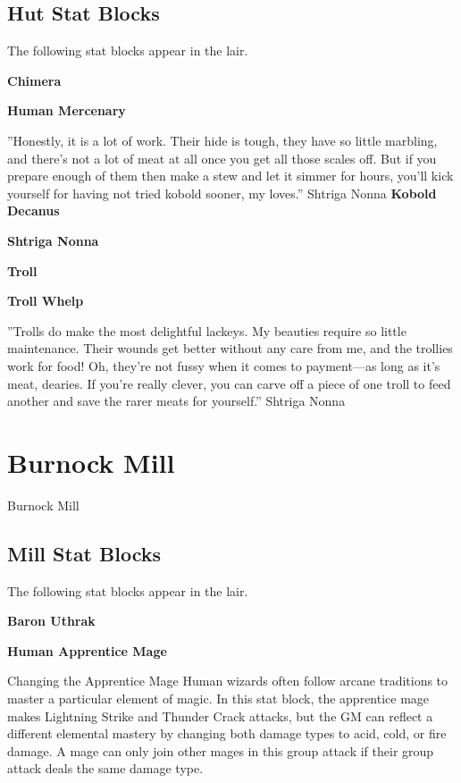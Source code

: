 \documentclass[10pt,a4paper,twoside,bg=print,twocolumn,openany,nodeprecatedcode]{dndbook}
\begin{document}
\section{Hut Stat Blocks}
The following stat blocks appear in the lair.

\textbf{Chimera}

\textbf{Human Mercenary}

\DndQuote%
{}
{''Honestly, it is a lot of work. Their hide is tough, they have so little marbling, and there's not a lot of meat at all once you get all those scales off. But if you prepare enough of them then make a stew and let it simmer for hours, you'll kick yourself for having not tried kobold sooner, my loves.''}
{Shtriga Nonna}
\textbf{Kobold Decanus}

\textbf{Shtriga Nonna}

\textbf{Troll}

\textbf{Troll Whelp}

\DndQuote%
{}
{''Trolls do make the most delightful lackeys. My beauties require so little maintenance. Their wounds get better without any care from me, and the trollies work for food! Oh, they're not fussy when it comes to payment—as long as it's meat, dearies. If you're really clever, you can carve off a piece of one troll to feed another and save the rarer meats for yourself.''}
{Shtriga Nonna}
\chapter{Burnock Mill}
Burnock Mill

\section{Mill Stat Blocks}
The following stat blocks appear in the lair.

\textbf{Baron Uthrak}

\textbf{Human Apprentice Mage}

\begin{DndSidebar}[float=!b]{Changing the Apprentice Mage}
Human wizards often follow arcane traditions to master a particular element of magic. In this stat block, the apprentice mage makes Lightning Strike and Thunder Crack attacks, but the GM can reflect a different elemental mastery by changing both damage types to acid, cold, or fire damage. A mage can only join other mages in this group attack if their group attack deals the same damage type.



\end{DndSidebar}
\end{document}
